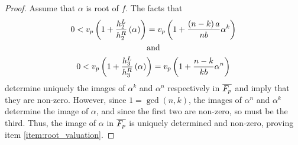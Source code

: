 \documentclass[../main.tex]{subfiles}
\begin{document}
  \begin{proof}
  Assume that $\alpha$ is \anex root of $f$.
  The facts that
  \begin{gather*}
    0 < v_p\left( 1 + \frac{h_{2}^L}{h_{2}^R}\left( \alpha  \right) \right) = v_p\left( 1 + \frac{\left( n-k \right)a}{nb}\alpha^k \right)
    \\
    \quad \text{ and } \quad \\ 
    0 < v_p\left( 1 + \frac{h_{3}^L}{h_{3}^R}\left( \alpha \right) \right) = v_p\left( 1 + \frac{n - k}{kb}\alpha^{n} \right) 
  \end{gather*} 
  determine uniquely the images of $\alpha^{k}$ and $\alpha^n$ respectively in $\overline{F_p}$ and imply that they are non-zero.
  However, since $1 = \gcd\left( n, k \right)$, the images of $\alpha^n$ and $\alpha^k$ determine the image of $\alpha$, and since the first two are non-zero, so must be the third.
  Thus, the image of $\alpha$ in $\overline{F_p}$ is uniquely determined and non-zero, proving item \ref{item:root_valuation}.
  

\end{proof}
\end{document}
